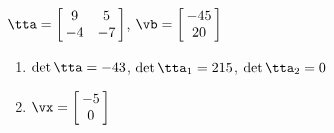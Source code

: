 {$\tta = \left[\hskip -3pt \begin{array}{cc} 9&5\\  -4&-7\end {array} \hskip -3pt
 \right] $,
 \quad
$\vb = \left[\hskip -3pt \begin{array}{c} -45\\  20\end {array} \hskip -3pt
 \right]$}
{\begin{enumerate}
\item	$\det{\tta} = -43$, $\det{\tta_1} = 215$, $\det{\tta_2} = 0$
\item $\vx = \left[\hskip -3pt \begin{array}{c} -5\\  0\end{array}\hskip -3pt \right]$
\end{enumerate}
}
